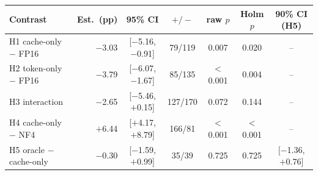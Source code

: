 \begin{tabular}{lrccccc}
\toprule
Contrast & Est.\ (pp) & 95\% CI & $+/-$ & raw $p$ & Holm $p$ & 90\% CI (H5) \\
\midrule
H1 cache-only $-$ FP16 & $-$3.03 & [$-$5.16, $-$0.91] & 79/119 & 0.007 & 0.020 & -- \\
H2 token-only $-$ FP16 & $-$3.79 & [$-$6.07, $-$1.67] & 85/135 & $<$0.001 & 0.004 & -- \\
H3 interaction & $-$2.65 & [$-$5.46, $+$0.15] & 127/170 & 0.072 & 0.144 & -- \\
H4 cache-only $-$ NF4 & $+$6.44 & [$+$4.17, $+$8.79] & 166/81 & $<$0.001 & $<$0.001 & -- \\
H5 oracle $-$ cache-only & $-$0.30 & [$-$1.59, $+$0.99] & 35/39 & 0.725 & 0.725 & [$-$1.36, $+$0.76] \\
\bottomrule
\end{tabular}
